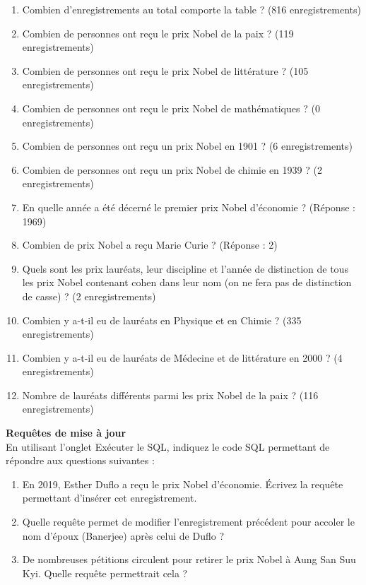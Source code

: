 \documentclass[a4paper,12pt,french]{book}
\begin{document}
\begin{exercice}
\begin{enumerate}[\bfseries 1.]
\item  Combien d’enregistrements au total comporte la table ? (816 enregistrements)
\item  Combien de personnes ont reçu le prix Nobel de la paix ? (119 enregistrements)
\item  Combien de personnes ont reçu le prix Nobel de littérature ? (105 enregistrements)
\item  Combien de personnes ont reçu le prix Nobel de mathématiques ? (0 enregistrements)
\item  Combien de personnes ont reçu un prix Nobel en 1901 ? (6 enregistrements)
\item  Combien de personnes ont reçu un prix Nobel de chimie en 1939 ? (2 enregistrements)
\item  En quelle année a été décerné le premier prix Nobel d’économie ? (Réponse : 1969)
\item  Combien de prix Nobel a reçu Marie Curie ? (Réponse : 2)
\item  Quels sont les prix lauréats, leur discipline et l’année de distinction de tous les prix Nobel contenant cohen dans leur nom (on ne fera pas de distinction de casse) ? (2 enregistrements)
\item  Combien y a-t-il eu de lauréats en Physique et en Chimie ? (335 enregistrements)
\item  Combien y a-t-il eu de lauréats de Médecine et de littérature en 2000 ? (4 enregistrements)
\item  Nombre de lauréats différents parmi les prix Nobel de la paix ? (116 enregistrements)\\
\end{enumerate}

\textbf{Requêtes de mise à jour}\\

En utilisant l’onglet Exécuter le SQL, indiquez le code SQL permettant de répondre aux questions suivantes :\\

\begin{enumerate}[\bfseries 1.]
\item En 2019, Esther Duflo a reçu le prix Nobel d’économie. Écrivez la requête permettant d’insérer cet enregistrement.
\item  Quelle requête permet de modifier l’enregistrement précédent pour accoler le nom d’époux (Banerjee) après celui de Duflo ?
\item   De nombreuses pétitions circulent pour retirer le prix Nobel à Aung San Suu Kyi. Quelle requête permettrait cela ?
\end{enumerate}
\end{exercice}
\end{document}
